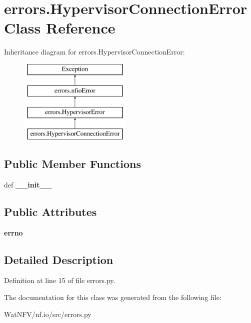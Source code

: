 \hypertarget{classerrors_1_1HypervisorConnectionError}{\section{errors.\-Hypervisor\-Connection\-Error Class Reference}
\label{classerrors_1_1HypervisorConnectionError}
}
Inheritance diagram for errors.\-Hypervisor\-Connection\-Error\-:\begin{figure}[H]
\begin{center}
\leavevmode
\includegraphics[height=4.000000cm]{classerrors_1_1HypervisorConnectionError}
\end{center}
\end{figure}
\subsection*{Public Member Functions}
\begin{DoxyCompactItemize}
\item 
\hypertarget{classerrors_1_1HypervisorConnectionError_a8ac18f912e2fa2866649688a43acc42c}{def {\bfseries \-\_\-\-\_\-init\-\_\-\-\_\-}}\label{classerrors_1_1HypervisorConnectionError_a8ac18f912e2fa2866649688a43acc42c}

\end{DoxyCompactItemize}
\subsection*{Public Attributes}
\begin{DoxyCompactItemize}
\item 
\hypertarget{classerrors_1_1HypervisorConnectionError_a4f3ea14dba51da58bf328573f69eabb4}{{\bfseries errno}}\label{classerrors_1_1HypervisorConnectionError_a4f3ea14dba51da58bf328573f69eabb4}

\end{DoxyCompactItemize}


\subsection{Detailed Description}


Definition at line 15 of file errors.\-py.



The documentation for this class was generated from the following file\-:\begin{DoxyCompactItemize}
\item 
Wat\-N\-F\-V/nf.\-io/src/errors.\-py\end{DoxyCompactItemize}
